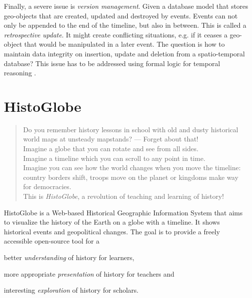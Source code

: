 Finally, a severe issue is \emph{version management}. Given a database model that stores geo-objects that are created, updated and destroyed by events. Events can not only be appended to the end of the timeline, but also in between. This is called a \emph{retrospective update}. It might create conflicting situations, e.g. if it ceases a geo-object that would be manipulated in a later event. The question is how to maintain data integrity on insertion, update and deletion from a spatio-temporal database? This issue has to be addressed using formal logic for temporal reasoning
\cite[section 6]{peuquet99}.




\section{HistoGlobe} %
\label{sec:histoglobe}

\begin{quote}
  Do you remember history lessons in school with old and dusty historical world maps at unsteady mapstands? --- Forget about that! \\[0.5em]
  Imagine a globe that you can rotate and see from all sides. \\
  Imagine a timeline which you can scroll to any point in time. \\
  Imagine you can see how the world changes when you move the timeline: \\
  country borders shift, troops move on the planet or kingdoms make way for democracies. \\[0.5em]
  This is \emph{HistoGlobe}, a revolution of teaching and learning of history!
\end{quote}

HistoGlobe is a Web-based Historical Geographic Information System that aims to visualize the history of the Earth on a globe with a timeline. It shows historical events and geopolitical changes. The goal is to provide a freely accessible open-source tool for a

\begin{compactitem}
  \item better \emph{understanding} of history for learners,
  \item more appropriate \emph{presentation} of history for teachers and
  \item interesting \emph{exploration} of history for scholars.
\end{compactitem}

